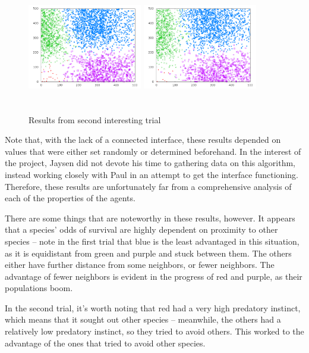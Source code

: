 \begin{figure}
    \includegraphics[width=5cm,height=5cm]{Trial2-20000.png}
    \includegraphics[width=5cm,height=5cm]{Trial2-25000.png}
    \caption{Results from second interesting trial}
\end{figure}

Note that, with the lack of a connected interface, these results depended on values
that were either set randomly or determined beforehand. In the interest of the
project, Jaysen did not devote his time to gathering data on this algorithm,
instead working closely with Paul in an attempt to get the interface functioning.\\
Therefore, these results are unfortunately far from a comprehensive analysis of
each of the properties of the agents.

There are some things that are noteworthy in these results, however. It appears
that a species' odds of survival are highly dependent on proximity to other species
-- note in the first trial that blue is the least advantaged in this situation, as
it is equidistant from green and purple and stuck between them. The others either
have further distance from some neighbors, or fewer neighbors. The advantage of
fewer neighbors is evident in the progress of red and purple, as their populations
boom.

In the second trial, it's worth noting that red had a very high predatory instinct,
which means that it sought out other species -- meanwhile, the others had a
relatively low predatory instinct, so they tried to avoid others. This worked to
the advantage of the ones that tried to avoid other species.

